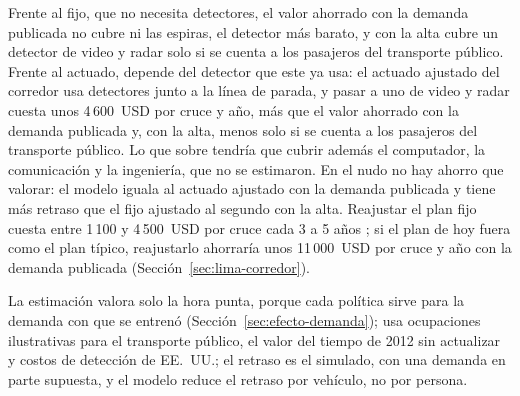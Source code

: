 Frente al fijo, que no necesita detectores, el valor ahorrado con la
demanda publicada no cubre ni las espiras, el detector más barato, y
con la alta cubre un detector de video y radar solo si se cuenta a los
pasajeros del transporte público. Frente al actuado, depende del
detector que este ya usa: el actuado ajustado del corredor usa
detectores junto a la línea de parada, y pasar a uno de video y radar
cuesta unos 4\,600~USD por cruce y año, más que el valor ahorrado con la
demanda publicada y, con la alta, menos solo si se cuenta a los
pasajeros del transporte público. Lo que sobre tendría que cubrir
además el computador, la comunicación y la ingeniería, que no se
estimaron. En el nudo no hay ahorro que valorar: el modelo iguala al
actuado ajustado con la demanda publicada y tiene más retraso que el
fijo ajustado al segundo con la alta. Reajustar el plan fijo
cuesta entre 1\,100 y 4\,500~USD por cruce cada 3 a 5 años
\citep{Boston2010_Retiming,FHWA2016_ATSPM}; si el plan de hoy fuera
como el plan típico, reajustarlo ahorraría unos 11\,000~USD por cruce y
año con la demanda publicada (Sección~\ref{sec:lima-corredor}).

La estimación valora solo la hora punta, porque cada política sirve
para la demanda con que se entrenó (Sección~\ref{sec:efecto-demanda});
usa ocupaciones ilustrativas para el transporte público, el valor del
tiempo de 2012 sin actualizar y costos de detección de EE.~UU.; el
retraso es el simulado, con una demanda en parte supuesta, y el modelo
reduce el retraso por vehículo, no por persona.


